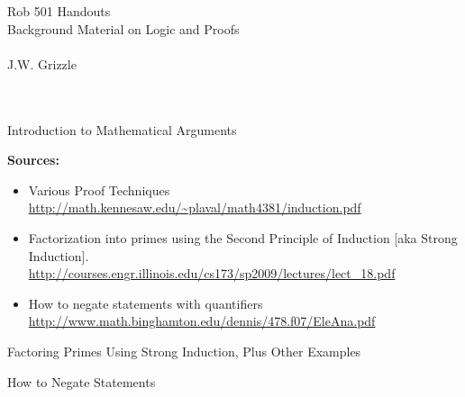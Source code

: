 \documentclass[12pt,letterpaper,headings=normal]{scrartcl}
\begin{document}


\baselineskip=48pt  %

%

\pagestyle{plain}

\vspace*{7cm}


\begin{center}
{\Large
 Rob 501 Handouts \\
 Background Material on Logic and Proofs \mbox{ } \\
\mbox{ } \\
J.W. Grizzle \\
\mbox{ } \\
\mbox{ }
}
\end{center}

\newpage

\newpage
\vspace*{10cm}
{\Large 
\begin{center}
 Introduction to Mathematical Arguments
\end{center}
}
\newpage

\textbf{Sources:}
{\footnotesize
\begin{itemize}
\item Various Proof Techniques\\
\url{http://math.kennesaw.edu/~plaval/math4381/induction.pdf}
\item  Factorization into primes using the Second Principle of Induction [aka Strong Induction].\\ \url{http://courses.engr.illinois.edu/cs173/sp2009/lectures/lect_18.pdf}
\item How to negate statements with quantifiers \\
\url{http://www.math.binghamton.edu/dennis/478.f07/EleAna.pdf}
\end{itemize}
}

\vspace*{\fill}
Factoring Primes Using Strong Induction, Plus Other Examples
\vspace*{\fill}

\vspace*{\fill}
How to Negate Statements
\vspace*{\fill}

\end{document}
